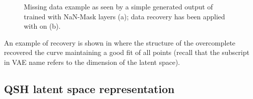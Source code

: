 \begin{figure}
    \centering
    \caption{Missing data example as seen by a simple generated output of  trained with NaN-Mask layers (a); 
    data recovery has been applied with  on (b). }
    \label{fig:missing recovery}
\end{figure}
An example of recovery is shown in \Figure{\ref{fig:missing recovery_b}} where the structure of the overcomplete  recovered the curve maintaining a good fit of all points (recall that the subscript in VAE name refers to the dimension of the latent space).
                   

\subsection{QSH latent space representation}


